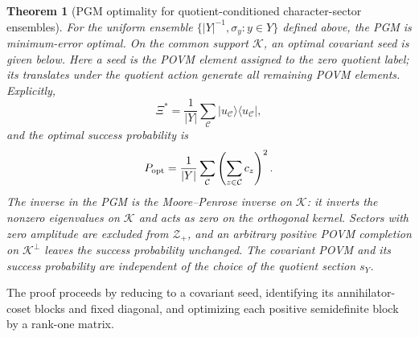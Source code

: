 \documentclass[11pt]{article}
\newcommand{\1}{\mathbf 1}
\newcommand{\ket}[1]{\lvert #1\rangle}
\newcommand{\bra}[1]{\langle #1\rvert}
\theoremstyle{plain}
\newtheorem{theorem}{Theorem}[section]
\theoremstyle{definition}
\theoremstyle{remark}
\begin{document}
\begin{theorem}[PGM optimality for quotient-conditioned character-sector ensembles]
\label{thm:detailed-seed-solution}
For the uniform ensemble $\{ \lvert Y\rvert^{-1},\sigma_y:y\in Y\}$ defined above, the
PGM is minimum-error optimal.  On the common
support $\mathcal K$, an optimal covariant seed is given below.  Here a
\emph{seed} is the POVM element assigned to the zero quotient label; its
translates under the quotient action generate all remaining POVM elements.
Explicitly,
\begin{equation}
 \Xi^*=\frac1{\lvert Y\rvert}\sum_{\mathcal C}
 \ket{u_{\mathcal C}}\!\bra{u_{\mathcal C}},
 \label{eq:global-seed}
\end{equation}
and the optimal success probability is
\begin{equation}
 P_{\rm opt}
 =\frac1{\lvert Y\rvert}\sum_{\mathcal C}
 \left(\sum_{z\in\mathcal C}c_z\right)^2.
 \label{eq:abstract-optimal-coset-formula}
\end{equation}
The inverse in the PGM is the Moore--Penrose inverse on $\mathcal K$: it
inverts the nonzero eigenvalues on $\mathcal K$ and acts as zero on the
orthogonal kernel.  Sectors with zero amplitude are excluded from
$\mathcal Z_+$, and an arbitrary
positive POVM completion on $\mathcal K^\perp$ leaves the success probability
unchanged.  The covariant POVM and its success probability are independent of
the choice of the quotient section $s_Y$.
\end{theorem}

The proof proceeds by reducing to a covariant seed, identifying its  
annihilator-coset blocks and fixed diagonal, and optimizing each positive  
semidefinite block by a rank-one matrix.  
\end{document}

